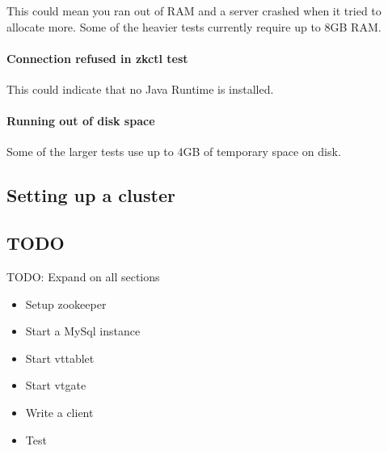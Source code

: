 This could mean you ran out of RAM and a server crashed when it tried to allocate more.
Some of the heavier tests currently require up to 8GB RAM.

\paragraph{Connection refused in zkctl test}\hypertarget{connection-refused-in-zkctl-test}{}\label{connection-refused-in-zkctl-test}

This could indicate that no Java Runtime is installed.

\paragraph{Running out of disk space}\hypertarget{running-out-of-disk-space}{}\label{running-out-of-disk-space}

Some of the larger tests use up to 4GB of temporary space on disk.

\subsection{Setting up a cluster}\hypertarget{setting-up-a-cluster}{}\label{setting-up-a-cluster}

\subsection{TODO}\hypertarget{TODO}{}\label{TODO}
TODO: Expand on all sections
\begin{itemize}
\item  Setup zookeeper
\item  Start a MySql instance
\item  Start vttablet
\item  Start vtgate
\item  Write a client
\item  Test
\end{itemize}

